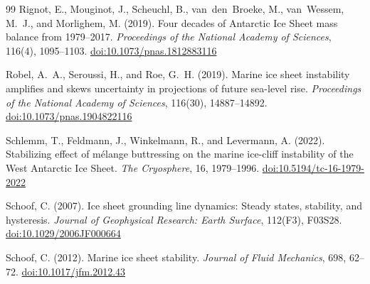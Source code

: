 \documentclass[11pt]{article}
\newcommand{\doi}[1]{\href{https://doi.org/#1}{doi:#1}}
\begin{document}
\begin{thebibliography}{99}
Rignot, E., Mouginot, J., Scheuchl, B., van~den~Broeke, M., van~Wessem, M.~J., and Morlighem, M. (2019).
Four decades of {A}ntarctic {I}ce {S}heet mass balance from 1979--2017.
\textit{Proceedings of the National Academy of Sciences}, 116(4), 1095--1103.
\doi{10.1073/pnas.1812883116}

Robel, A.~A., Seroussi, H., and Roe, G.~H. (2019).
Marine ice sheet instability amplifies and skews uncertainty in projections of future sea-level rise.
\textit{Proceedings of the National Academy of Sciences}, 116(30), 14887--14892.
\doi{10.1073/pnas.1904822116}

Schlemm, T., Feldmann, J., Winkelmann, R., and Levermann, A. (2022).
Stabilizing effect of m\'{e}lange buttressing on the marine ice-cliff instability of the {W}est {A}ntarctic {I}ce {S}heet.
\textit{The Cryosphere}, 16, 1979--1996.
\doi{10.5194/tc-16-1979-2022}

Schoof, C. (2007).
Ice sheet grounding line dynamics: Steady states, stability, and hysteresis.
\textit{Journal of Geophysical Research: Earth Surface}, 112(F3), F03S28.
\doi{10.1029/2006JF000664}

Schoof, C. (2012).
Marine ice sheet stability.
\textit{Journal of Fluid Mechanics}, 698, 62--72.
\doi{10.1017/jfm.2012.43}

\end{thebibliography}
\end{document}
